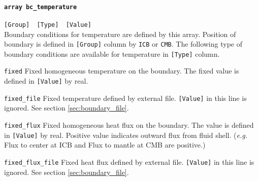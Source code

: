 \paragraph{\tt array bc\_temperature}
\label{href_t:bc_temperature}
\verb|[Group]  [Type]  [Value]| \\
Boundary conditions for temperature are defined by this array. Position of boundary is defined in \verb|[Group]| column by {\tt ICB} or {\tt CMB}. The following type of boundary conditions are available for temperature in \verb|[Type]| column.
%
\begin{description}
\item{\tt fixed}			Fixed homogeneous temperature on the boundary. The fixed value is defined in \verb|[Value]| by real.
\item{\tt fixed\_file}			Fixed temperature defined by external file. \verb|[Value]| in this line is ignored. See section \ref{sec:boundary_file}.
\item{\tt fixed\_flux}	Fixed homogeneous heat flux on the boundary. The value is defined in \verb|[Value]| by real. Positive value indicates outward flux from fluid shell. ({\it e.g.} Flux to center at ICB and Flux to mantle at CMB are positive.)
\item{\tt fixed\_flux\_file}			Fixed heat flux defined by external file. \verb|[Value]| in this line is ignored.  See section \ref{sec:boundary_file}.
\end{description}
%

